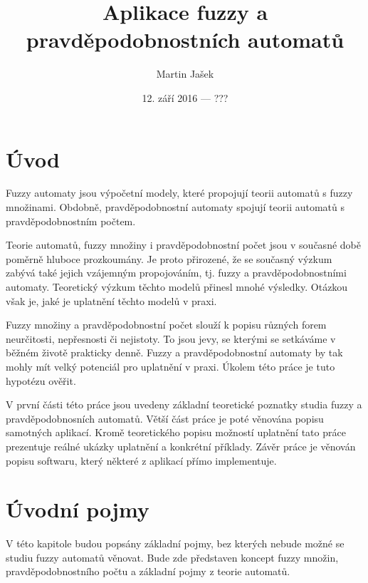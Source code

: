 \documentclass[a4paper,10pt]{article}
\title{Aplikace fuzzy a pravděpodobnostních automatů}
\author{Martin Jašek}
\date{12. září 2016 --- ???}
\begin{document}
\maketitle
\tableofcontents
\newpage

\section{Úvod}
Fuzzy automaty jsou výpočetní modely, které propojují teorii automatů s fuzzy množinami. Obdobně, pravděpodobnostní automaty spojují teorii automatů s pravděpodobnostním počtem.

Teorie automatů, fuzzy množiny i pravděpodobnostní počet jsou v současné době poměrně hluboce prozkoumány. Je proto přirozené, že se současný výzkum zabývá také jejich vzájemným propojováním, tj. fuzzy a pravděpodobnostními automaty. Teoretický výzkum těchto modelů přinesl mnohé výsledky. Otázkou však je, jaké je uplatnění těchto modelů v praxi.

Fuzzy množiny a pravděpodobnostní počet slouží k popisu různých forem neurčitosti, nepřesnosti či nejistoty. To jsou jevy, se kterými se setkáváme v běžném životě prakticky denně. Fuzzy a pravděpodobnostní automaty by tak mohly mít velký potenciál pro uplatnění v praxi. Úkolem této práce je tuto hypotézu ověřit.

V první části této práce jsou uvedeny základní teoretické poznatky studia fuzzy a pravděpodobnosních automatů. Větší část práce je poté věnována popisu samotných aplikací. Kromě teoretického popisu možností uplatnění tato práce prezentuje reálné ukázky uplatnění a konkrétní příklady. Závěr práce je věnován popisu softwaru, který některé z aplikací přímo implementuje.


\section{Úvodní pojmy}
V této kapitole budou popsány základní pojmy, bez kterých nebude možné se studiu fuzzy automatů věnovat. Bude zde představen koncept fuzzy množin, pravděpodobnostního počtu a základní pojmy z teorie automatů.
\end{document}
